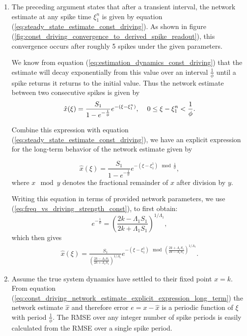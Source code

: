 \begin{enumerate}
\item The preceding argument states that after a transient interval, the network estimate at any spike time $\xi_1^n$ is given by equation (\ref{eq:steady_state_estimate_const_driving}). As shown in figure (\ref{fig:const_driving_convergence_to_derived_spike_readout}), this convergence occurs after roughly 5 spikes under the given parameters. 


We know from equation (\ref{eq:estimation_dynamics_const_driving}) that the estimate will decay exponentially from this value over an interval $\frac{1}{\phi}$ until a spike returns it returns to the initial value. Thus the network estimate between two consecutive spikes is given by 
\begin{align*}
\hat{x}(\xi) = \frac{S_1}{1 - e^{-\frac{1}{\phi}}} e^{-(\xi - \xi_1^n)}, \hspace{4mm} 0 \leq \xi - \xi_1^n  < \frac{1}{\phi}.
\end{align*}

Combine this expression with equation (\ref{eq:steady_state_estimate_const_driving}), we have an explicit expression for the long-term behavior of the network estimate given by 

\begin{equation}
\label{eq:const_driving_network_estimate_explicit_expression_long_term_phi}
\hat{x}(\xi) =
\frac{S_1}{1 - e^{-\frac{1}{\phi}}} e^{- (\xi - \xi_1^1) \mod{\frac{1}{\phi}}},
\end{equation} 
where $x \mod{y}$ denotes the fractional remainder of $x$ after division by $y$. 

Writing this equation in terms of provided network parameters, we use (\ref{eq:freq_vs_driving_strength_const}), to first obtain:
$$
e^{-\frac{1}{\phi}} = \left(\frac{2 k-\Lambda_1 S_1}{2 k+\Lambda_1 S_1}\right)^{1/\Lambda_1},
$$
which then gives
\begin{align}
\label{eq:const_driving_network_estimate_explicit_expression_long_term}
\hat{x}(\xi) =
\frac{S_1}
{
	\left(\frac{2 k-\Lambda_1 S_1}{2 k+\Lambda_1 S_1}\right)^{1/\Lambda_1}
}
 e^{- (\xi - \xi_1^1) \mod{\left(\frac{2 k+\Lambda_1 S_1}{2 k-\Lambda_1 S_1}\right)^{1/\Lambda_1}}}.
\end{align}


\item Assume the true system dynamics have settled to their fixed point $x = k$. From equation (\ref{eq:const_driving_network_estimate_explicit_expression_long_term}) the network estimate $\hat{x}$ and therefore error $e = x - \hat{x}$ is a periodic function of $\xi$ with period $\frac{1}{\phi}$. The RMSE over any integer number of spike periods is easily calculated from the RMSE over a single spike period. 


\end{enumerate}

